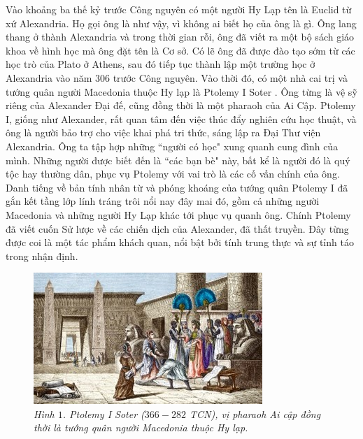 \vspace*{-5pt}
\begin{multicols}{2}
	Vào khoảng ba thế kỷ trước Công nguyên có một người Hy Lạp tên là Euclid từ xứ Alexandria. Họ gọi ông là như vậy, vì không ai biết họ của ông là gì. Ông lang thang ở thành Alexandria và trong thời gian rỗi, ông đã viết ra một bộ sách giáo khoa về hình học mà ông đặt tên là Cơ sở. Có lẽ ông đã được đào tạo sớm từ các học trò của Plato ở Athens, sau đó tiếp tục thành lập một trường học ở Alexandria vào năm $306$ trước Công nguyên. 
	\vskip 0.1cm
	Vào thời đó, có một nhà cai trị và tướng quân người Macedonia thuộc Hy lạp  là Ptolemy I Soter . Ông từng là vệ sỹ riêng của Alexander Đại đế, cũng đồng thời là một pharaoh của Ai Cập. Ptolemy I, giống như Alexander, rất quan tâm đến việc thúc đẩy nghiên cứu học thuật, và ông là người bảo trợ cho việc khai phá tri thức, sáng lập ra Đại Thư viện Alexandria. Ông ta tập hợp những ``người có học" xung quanh cung đình của mình.  Những người được biết đến là ``các bạn bè" này, bất kể là người đó là quý tộc hay thường dân, phục vụ Ptolemy với vai trò là các cố vấn chính của ông. Danh tiếng về bản tính nhân từ và phóng khoáng của tướng quân Ptolemy I đã gắn kết tầng lớp lính tráng trôi nổi nay đây mai đó, gồm cả những người Macedonia và những người Hy Lạp khác  tới phục vụ quanh ông. Chính Ptolemy đã viết cuốn Sử lược về các chiến dịch của Alexander, đã thất truyền. Đây từng được coi là một tác phẩm khách quan, nổi bật bởi tính trung thực và sự tỉnh táo trong nhận định. 
	\begin{figure}[H]
		\vspace*{-5pt}
		\centering
		\captionsetup{labelformat= empty, justification=centering}
		\includegraphics[width= 1\linewidth]{1}
		\caption{\small\textit{\color{quantoan}Hình $1$. Ptolemy I Soter ($366-282$ TCN), vị pharaoh Ai cập đồng thời là tướng quân người Macedonia thuộc Hy lạp.}}

\end{figure}
\end{multicols}
